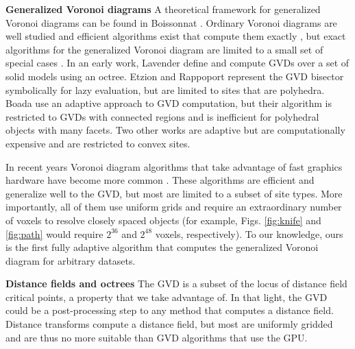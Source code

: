 \documentclass{egpubl}
\renewcommand{\paragraph}[1]{\noindent \textbf{#1}}
\begin{document}
\paragraph{Generalized Voronoi diagrams}
A theoretical framework for generalized Voronoi diagrams can be found in Boissonnat \etal {}. Ordinary Voronoi diagrams are well studied and efficient algorithms exist that compute them exactly \cite{de2008computational}, but exact algorithms for the generalized Voronoi diagram are limited to a small set of special cases \cite{lee1982medial,karavelas2004robust}. In an early work, Lavender \etal {} define and compute GVDs over a set of solid models using an octree.  Etzion and Rappoport  represent the GVD bisector symbolically for lazy evaluation, but are limited to sites that are polyhedra.  Boada \etal {} use an adaptive approach to GVD computation, but their algorithm is restricted to GVDs with connected regions and is inefficient for polyhedral objects with many facets.  Two other works are adaptive \cite{teichmann1997polygonal,vleugels1998approximating} but are computationally expensive and are restricted to convex sites.

In recent years Voronoi diagram algorithms that take advantage of fast graphics hardware have become more common \cite{cao2010parallel,fischer2006fast,hsieh2005simple,rong2007variants,sud2006interactive,sud2006fast,hoff1999fast,wu2008gpu}.  These algorithms are efficient and generalize well to the GVD, but most are limited to a subset of site types.  More importantly, all of them use uniform grids and require an extraordinary number of voxels to resolve closely spaced objects (for example, Figs. \ref{fig:knife} and \ref{fig:path} would require $2^{36}$ and $2^{48}$ voxels, respectively).  To our knowledge, ours is the first fully adaptive algorithm that computes the generalized Voronoi diagram for arbitrary datasets.

\paragraph{Distance fields and octrees}
The GVD is a subset of the locus of distance field critical points, a property that we take advantage of. In that light, the GVD could be a post-processing step to any method that computes a distance field.  Distance transforms compute a distance field, but most are uniformly gridded \cite{jones20063d} and are thus no more suitable than GVD algorithms that use the GPU.
\end{document}
